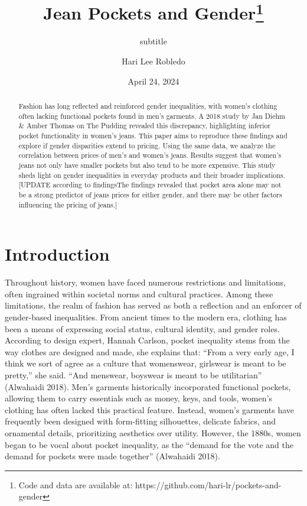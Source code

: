 \documentclass[
  letterpaper,
  DIV=11,
  numbers=noendperiod]{scrartcl}
\title{Jean Pockets and Gender\thanks{Code and data are available at:
https://github.com/hari-lr/pockets-and-gender}}
\subtitle{subtitle}
\author{Hari Lee Robledo}
\date{April 24, 2024}
\renewcommand*\contentsname{Table of contents}
\newcommand\contentsname{Table of contents}
\begin{document}
\maketitle
\begin{abstract}
Fashion has long reflected and reinforced gender inequalities, with
women's clothing often lacking functional pockets found in men's
garments. A 2018 study by Jan Diehm \& Amber Thomas on The Pudding
revealed this discrepancy, highlighting inferior pocket functionality in
women's jeans. This paper aims to reproduce these findings and explore
if gender disparities extend to pricing. Using the same data, we analyze
the correlation between prices of men's and women's jeans. Results
suggest that women's jeans not only have smaller pockets but also tend
to be more expensive. This study sheds light on gender inequalities in
everyday products and their broader implications. {[}UPDATE according to
findingsThe findings revealed that pocket area alone may not be a strong
predictor of jeans prices for either gender, and there may be other
factors influencing the pricing of jeans.{]}
\end{abstract}
\ifdefined\Shaded\renewenvironment{Shaded}{\begin{tcolorbox}[enhanced, boxrule=0pt, frame hidden, breakable, interior hidden, sharp corners, borderline west={3pt}{0pt}{shadecolor}]}{\end{tcolorbox}}\fi

\renewcommand*\contentsname{Table of contents}
{
\hypersetup{linkcolor=}
\setcounter{tocdepth}{3}
\tableofcontents
}
\newpage

\hypertarget{introduction}{%
\section{Introduction}\label{introduction}}

Throughout history, women have faced numerous restrictions and
limitations, often ingrained within societal norms and cultural
practices. Among these limitations, the realm of fashion has served as
both a reflection and an enforcer of gender-based inequalities. From
ancient times to the modern era, clothing has been a means of expressing
social status, cultural identity, and gender roles. According to design
expert, Hannah Carlson, pocket inequality stems from the way clothes are
designed and made, she explains that: ``From a very early age, I think
we sort of agree as a culture that womenswear, girlswear is meant to be
pretty,'' she said. ``And menswear, boyswear is meant to be
utilitarian'' (Alwahaidi 2018). Men's garments historically incorporated
functional pockets, allowing them to carry essentials such as money,
keys, and tools, women's clothing has often lacked this practical
feature. Instead, women's garments have frequently been designed with
form-fitting silhouettes, delicate fabrics, and ornamental details,
prioritizing aesthetics over utility. However, the 1880s, women began to
be vocal about pocket inequality, as the ``demand for the vote and the
demand for pockets were made together'' (Alwahaidi 2018).
\end{document}
